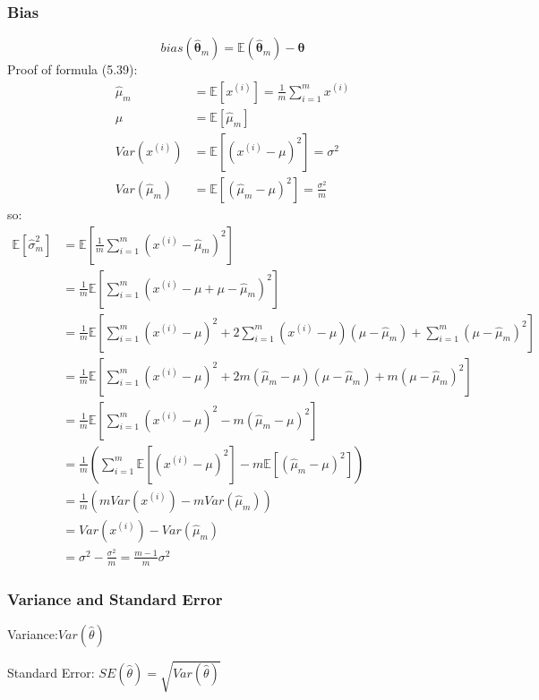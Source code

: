 \documentclass[12pt]{article}
\numberwithin{equation}{section}
\begin{document}
\subsubsection{Bias}
\begin{equation}
	bias(\hat{{\boldsymbol\theta}}_m)=\mathbb{E}(\hat{\boldsymbol\theta}_m)-\boldsymbol\theta
\end{equation}
Proof of formula (5.39):
\begin{equation}\begin{split}
	\hat{\mu}_m&=\mathbb{E}[x^{(i)}]=\frac{1}{m}\sum_{i=1}^{m}x^{(i)} \\
	\mu&=\mathbb{E}[\hat{\mu}_m] \\
	Var(x^{(i)})&=\mathbb{E}[(x^{(i)}-\mu)^2]=\sigma^2 \\
	Var(\hat{\mu}_m)&=\mathbb{E}[(\hat{\mu}_m-\mu)^2] =\frac{\sigma^2}{m}
\end{split}\end{equation}
so:
\begin{equation}\begin{split}
	\mathbb{E}[\hat{\sigma}^2_m]
	&=\mathbb{E}[\frac{1}{m}\sum_{i=1}^{m}(x^{(i)}-\hat{\mu}_m)^2] \\
	&=\frac{1}{m}\mathbb{E}[\sum_{i=1}^{m}(x^{(i)}-\mu+\mu-\hat{\mu}_m)^2] \\
	&=\frac{1}{m}\mathbb{E}[\sum_{i=1}^{m}(x^{(i)}-\mu)^2+2\sum_{i=1}^{m}(x^{(i)}-\mu)(\mu-\hat{\mu}_m)+\sum_{i=1}^{m}(\mu-\hat{\mu}_m)^2] \\
	&=\frac{1}{m}\mathbb{E}[\sum_{i=1}^{m}(x^{(i)}-\mu)^2+2m(\hat{\mu}_m-\mu)(\mu-\hat{\mu}_m)+m(\mu-\hat{\mu}_m)^2] \\
	&=\frac{1}{m}\mathbb{E}[\sum_{i=1}^{m}(x^{(i)}-\mu)^2-m(\hat{\mu}_m-\mu)^2] \\
	&=\frac{1}{m}(\sum_{i=1}^{m}\mathbb{E}[(x^{(i)}-\mu)^2]-m\mathbb{E}[(\hat{\mu}_m-\mu)^2]) \\
	&=\frac{1}{m}(mVar(x^{(i)})-mVar(\hat{\mu}_m)) \\
	&=Var(x^{(i)})-Var(\hat{\mu}_m) \\
	&=\sigma^2-\frac{\sigma^2}{m}=\frac{m-1}{m}\sigma^2
\end{split}\end{equation}
\subsubsection{Variance and Standard Error}
Variance:$ Var(\hat{\theta})$ \par
Standard Error: $SE(\hat{\theta})=\sqrt{Var(\hat{\theta})}$ \par
\end{document}
